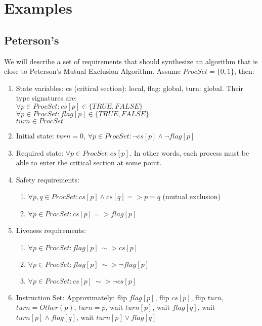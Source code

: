 \documentclass[12pt]{article}
\begin{document}
\section{Examples}
\subsection{Peterson's}
We will describe a set of requirements that should synthesize an algorithm that is close to Peterson's Mutual Exclusion Algorithm.  Assume $ProcSet = \{0,1\}$, then:
	\begin{enumerate}
		\item State variables: cs (critical section): local, flag: global, turn: global.  Their type signatures are: \\
				$\forall p \in ProcSet : cs[p] \in \{TRUE,FALSE\}$ \\
				$\forall p \in ProcSet : flag[p] \in \{TRUE,FALSE\}$ \\
				$turn \in ProcSet$
		\item Initial state: $turn = 0$, $\forall p \in ProcSet: \lnot cs[p] \wedge \lnot flag[p]$
		\item Required state: $\forall p \in ProcSet : cs[p]$.  In other words, each process must be able to enter the critical section at some point.  
		\item Safety requirements:
			\begin{enumerate}
				\item $\forall p,q \in ProcSet : cs[p] \wedge cs[q] => p = q$ (mutual exclusion)
				\item $\forall p \in ProcSet : cs[p] => flag[p]$
			\end{enumerate}
		\item Liveness requirements:
			\begin{enumerate}
				\item $\forall p \in ProcSet : flag[p] ~\sim> cs[p]$
				\item $\forall p \in ProcSet : flag[p] ~\sim> \lnot flag[p]$
				\item $\forall p \in ProcSet : cs[p] ~\sim> \lnot cs[p]$
			\end{enumerate}
		\item Instruction Set: Approximately: flip $flag[p]$, flip $cs[p]$, flip $turn$, $turn = Other(p)$, $turn = p$, wait $turn[p]$, wait $flag[q]$, wait $turn[p] \wedge flag[q]$, wait $turn[p] \vee flag[q]$
	\end{enumerate}
\end{document}

